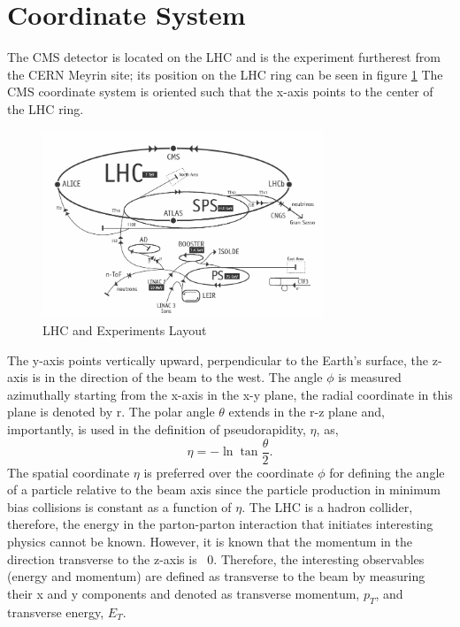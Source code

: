 \section{Coordinate System}
The CMS detector is located on the LHC and is the experiment furtherest from the
CERN Meyrin site; its position on the LHC ring can be seen in figure \ref{fig:LHCRings}
The CMS coordinate system is oriented such that the x-axis points to the center of the LHC
ring. 
\begin{figure}[hb]
  \centering
	\includegraphics[width=0.75\textwidth]{images/LHCLayout.png}
  	\caption[e/$\gamma$ LHC Layout]
   	{LHC and Experiments Layout}
	\label{fig:LHCRings}
\end{figure}
The y-axis points vertically upward, perpendicular to the Earth's surface,
the z-axis is in the direction of the beam to the west. The angle $\phi$ is measured
azimuthally starting from the x-axis in the x-y plane, the radial coordinate in this plane
is denoted by r. The polar angle $\theta$ extends in the r-z plane and, importantly,
is used in the definition of pseudorapidity, $\eta$, as, 
\begin{displaymath}
\eta=-\ln{\tan\frac{\theta}{2}}.
\end{displaymath}
The spatial coordinate $\eta$ is preferred over the coordinate $\phi$ for 
defining the angle of a particle relative to the beam axis since
the particle production in minimum bias collisions is constant as a function of $\eta$.
The LHC is a hadron collider, therefore, the energy in the parton-parton interaction
that initiates interesting physics cannot be known. However, it is known that 
the momentum in the direction transverse to the z-axis is ~0. Therefore,
the interesting observables (energy and momentum) are defined as transverse
to the beam by measuring their x and y components and denoted as transverse
momentum, $p_{T}$, and transverse energy, $E_{T}$.%
%
